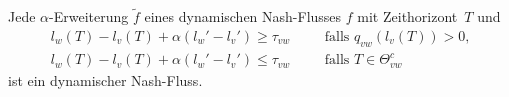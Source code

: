 \begin{frame}
	\begin{theorem}
		Jede $\alpha$-Erweiterung $\tilde{f}$ eines dynamischen Nash-Flusses $f$ mit Zeithorizont~$T$ und
		\begin{align*}
			l_w(T) - l_v(T) + \alpha(l_w' - l_v') \geq \tau_{vw} &\text{ ~~~~falls $q_{vw}(l_v(T)) > 0$,}\\
			l_w(T) - l_v(T) + \alpha(l_w' - l_v') \leq \tau_{vw} &\text{ ~~~~falls $T\in\Theta_{vw}^c $}
		\end{align*}
		ist ein dynamischer Nash-Fluss.
	\end{theorem}
\end{frame}
